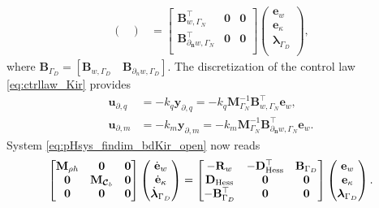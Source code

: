 \begin{equation}
\begin{aligned}
\begin{pmatrix}
\end{pmatrix}
&= \begin{bmatrix}
\mathbf{B}_{w, \Gamma_N}^\top & \mathbf{0} &  \mathbf{0} \\
\mathbf{B}_{\partial_{\bm{n}} w, \Gamma_N}^\top & \mathbf{0} & \mathbf{0} \\
\end{bmatrix}
\begin{pmatrix}
{\mathbf{e}}_{w} \\
{\mathbf{e}}_{\kappa} \\
{\bm{\lambda}}_{\Gamma_D} \\
\end{pmatrix},
\end{aligned}
\end{equation}
where $\mathbf{B}_{\Gamma_D} = [\mathbf{B}_{w, \Gamma_D} \quad \mathbf{B}_{\partial_n w, \Gamma_D}]$. The discretization of the control law \eqref{eq:ctrllaw_Kir} provides
\begin{equation}
\begin{aligned}
\mathbf{u}_{\partial, q} &= -k_q \mathbf{y}_{\partial, q} = - k_q \mathbf{M}_{\Gamma_N}^{-1} \mathbf{B}_{w, \Gamma_N}^\top \mathbf{e}_w, \\
\mathbf{u}_{\partial, m} &= -k_m \mathbf{y}_{\partial, m} = - k_m \mathbf{M}_{\Gamma_N}^{-1} \mathbf{B}_{\partial_{\bm{n}} w, \Gamma_N}^\top \mathbf{e}_w.
\end{aligned}
\end{equation}
System \eqref{eq:pHsys_findim_bdKir_open} now reads
\begin{equation}
\begin{bmatrix}
\mathbf{M}_{\rho h} & \mathbf{0} & \mathbf{0}\\
\mathbf{0} & \mathbf{M}_{\bm{\mathcal{C}}_b} & \mathbf{0}\\
\mathbf{0} & \mathbf{0} & \mathbf{0}\\
\end{bmatrix}
\begin{pmatrix}
\dot{\mathbf{e}}_{w} \\
\dot{\mathbf{e}}_{\kappa} \\
\dot{\bm{\lambda}}_{\Gamma_D} \\
\end{pmatrix}
= \begin{bmatrix}
-\mathbf{R}_w  & - \mathbf{D}_{\operatorname*{Hess}}^\top & \mathbf{B}_{\Gamma_D}\\
\mathbf{D}_{\operatorname*{Hess}} & \mathbf{0} & \mathbf{0} \\
-\mathbf{B}_{\Gamma_D}^\top & \mathbf{0} & \mathbf{0} \\
\end{bmatrix} 
\begin{pmatrix}
{\mathbf{e}}_{w} \\
{\mathbf{e}}_{\kappa} \\
{\bm{\lambda}}_{\Gamma_D} \\
\end{pmatrix}.
\end{equation}

